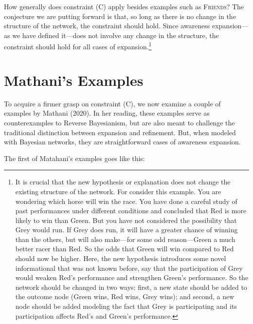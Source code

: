 \documentclass[
  11pt,
  dvipsnames,enabledeprecatedfontcommands]{scrartcl}
\begin{document}
How generally does constraint (C) apply besides examples such as
\textsc{Friends}? The conjecture we are putting forward is that, so long
as there is no change in the structure of the network, the constraint
should hold. Since awareness expansion---as we have defined it---does
not involve any change in the structure, the constraint should hold for
all cases of expansion.\footnote{It is crucial that the new hypothesis
  or explanation does not change the existing structure of the network.
  For consider this example. You are wondering which horse will win the
  race. You have done a careful study of past performances under
  different conditions and concluded that Red is more likely to win than
  Green. But you have not considered the possibility that Grey would
  run. If Grey does run, it will have a greater chance of winning than
  the others, but will also make---for some odd reason---Green a much
  better racer than Red. So the odds that Green will win compared to Red
  should now be higher. Here, the new hypothesis introduces some novel
  informational that was not known before, say that the participation of
  Grey would weaken Red's performance and strengthen Green's
  performance. So the network should be changed in two ways: first, a
  new state should be added to the outcome node (Green wins, Red wins,
  Grey wins); and second, a new node should be added modeling the fact
  that Grey is participating and its participation affects Red's and
  Green's performance.}

\hypertarget{mathanis-examples}{%
\section{Mathani's Examples}\label{mathanis-examples}}

To acquire a firmer grasp on constraint (C), we now examine a couple of
examples by Mathani (2020). In her reading, these examples serve as
counterexamples to Reverse Bayesianism, but are also meant to challenge
the traditional distinction between expansion and refinement. But, when
modeled with Bayesian networks, they are straightforward cases of
awareness expansion.

The first of Matahani's examples goes like this:
\end{document}
